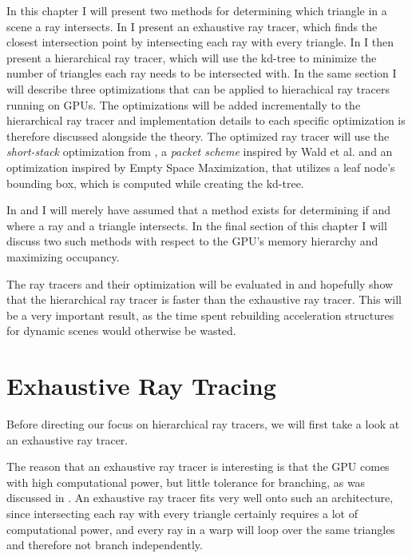 In this chapter I will present two methods for determining which triangle in a
scene a ray intersects. In  I present an exhaustive
ray tracer, which finds the closest intersection point by intersecting each ray
with every triangle. In  I then present a
hierarchical ray tracer, which will use the kd-tree to minimize the number of
triangles each ray needs to be intersected with. In the same section I will
describe three optimizations that can be applied to hierachical ray tracers
running on GPUs. The optimizations will be added incrementally to the
hierarchical ray tracer and implementation details to each specific optimization
is therefore discussed alongside the theory. The optimized ray tracer will use
the \textit{short-stack} optimization from \horn, a \textit{packet scheme}
inspired by Wald et al. and an optimization inspired
by Empty Space Maximization, that utilizes a leaf node's bounding box, which is
computed while creating the kd-tree.

In  and  I will
merely have assumed that a method exists for determining if and where a ray and
a triangle intersects. In the final section of this chapter I will discuss two
such methods with respect to the GPU's memory hierarchy and maximizing
occupancy.

The ray tracers and their optimization will be evaluated in
 and hopefully show that the hierarchical ray tracer is
faster than the exhaustive ray tracer. This will be a very important result, as
the time spent rebuilding acceleration structures for dynamic scenes would
otherwise be wasted.




\section{Exhaustive Ray Tracing} \label{sec:exhaustive}

Before directing our focus on hierarchical ray tracers, we will first
take a look at an exhaustive ray tracer.


The reason that an exhaustive ray tracer is interesting is that the GPU comes
with high computational power, but little tolerance for branching, as was
discussed in . An exhaustive ray tracer fits
very well onto such an architecture, since intersecting each ray with every
triangle certainly requires a lot of computational power, and every ray in a
warp will loop over the same triangles and therefore not branch independently.


